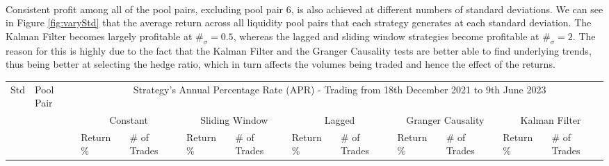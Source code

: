 \\[3mm]
Consistent profit among all of the pool pairs, excluding pool pair 6, is also achieved at different numbers of standard deviations. We can see in Figure \ref{fig:varyStd} that the average return across all liquidity pool pairs that each strategy generates at each standard deviation. The Kalman Filter becomes largely profitable at $\#_{\sigma} = 0.5$, whereas the lagged and sliding window strategies become profitable at $\#_{\sigma} = 2$. The reason for this is highly due to the fact that the Kalman Filter and the Granger Causality tests are better able to find underlying trends, thus being better at selecting the hedge ratio, which in turn affects the volumes being traded and hence the effect of the returns.

\begin{table}[!htb]
    \centering
    \begin{adjustwidth}{-0.8in}{-0.9in}
        \begin{tabular}{|p{4em}|p{2em}|p{3em}|p{3em}|p{3em}|p{3em}|p{3em}|p{3em}|p{3em}|p{3em}|p{3em}|p{3em}|}\hline
            Std & Pool Pair & \multicolumn{10}{|c|}{Strategy's Annual Percentage Rate (APR) - Trading from 18th December 2021 to 9th June 2023} \\\cline{3-12}
            &   & \multicolumn{2}{|c|}{Constant} & \multicolumn{2}{|c|}{Sliding Window} & \multicolumn{2}{|c|}{Lagged} & \multicolumn{2}{|c|}{Granger Causality} & \multicolumn{2}{|c|}{Kalman Filter}\\\cline{3-12}
            & & Return \% & \# of Trades & Return \% & \# of Trades & Return \% & \# of Trades & Return \% & \# of Trades & Return \% & \# of Trades\\\hline


\end{tabular}
\end{adjustwidth}
\end{table}
